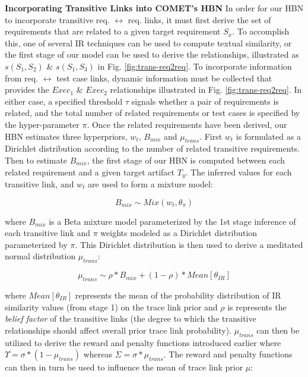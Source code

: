{\textbf{Incorporating Transitive Links into C{\footnotesize OMET}'s HBN}} In order for our HBN to incorporate transitive req. $\leftrightarrow$ req. links, it must first derive the set of requirements that are related to a given target requirement $S_x$. To accomplish this, one of several IR techniques can be used to compute textual similarity, or the first stage of our model can be used to derive the relationships, illustrated as $s(S_1,S_2)$ \& $s(S_1,S_3)$ in Fig. \ref{fig:trans-req2req}. To incorporate information from req. $\leftrightarrow$ test case links, dynamic information must be collected that provides the $Exec_1$ \& $Exec_2$ relationships illustrated in Fig. \ref{fig:trans-req2req}. In either case, a specified threshold $\tau$ signals whether a pair of requirements is related, and the total number of related requirements or test cases is specified by the hyper-parameter $\pi$.  Once the related requirements have been derived, our HBN estimates three hyperpriors, $w_t$, $B_{mix}$ and $\mu_{trans}$. First $w_t$ is formulated as a Dirichlet distribution according to the number of related transitive requirements. Then to estimate $B_{mix}$, the first stage of our HBN is computed between each related requirement and a given target artifact $T_y$. The inferred values for each transitive link, and $w_t$ are used to form a mixture model:

\begin{equation}
	B_{mix} \sim Mix(w_t,\theta_\pi)
\end{equation}

\noindent where $B_{mix}$ is a Beta mixture model parameterized by the 1st stage inference of each transitive link and $\pi$ weights modeled as a Dirichlet distribution parameterized by $\pi$. This Dirichlet distribution is then used to derive a meditated normal distribution $\mu_{trans}$:

\begin{equation}
	\mu_{trans} \sim \rho*B_{mix} + (1-\rho)*Mean[\theta_{IR}]
\end{equation}

\noindent where $Mean[\theta_{IR}]$ represents the mean of the probability distribution of IR similarity values (from stage 1) on the trace link prior and $\rho$ is represents the \textit{belief factor} of the transitive links (\eg the degree to which the transitive relationships should affect overall prior trace link probability). $\mu_{trans}$ can then be utilized to derive the reward and penalty functions introduced earlier where $\Upsilon = \sigma*(1-\mu_{trans})$ whereas $\Sigma = \sigma*\mu_{trans}$. The reward and penalty functions can then in turn be used to influence the mean of trace link prior $\mu$:


